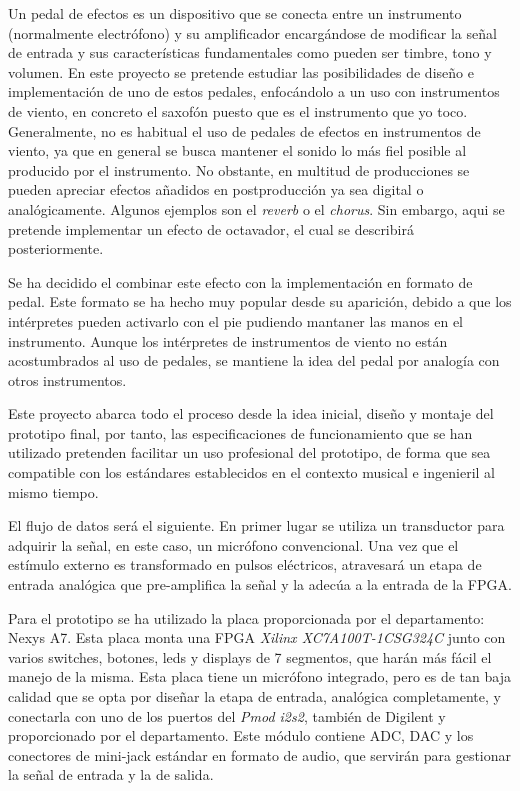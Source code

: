 Un pedal de efectos es un dispositivo que se conecta entre un instrumento (normalmente electrófono) y su amplificador encargándose de modificar la señal de entrada y sus características fundamentales como pueden ser timbre, tono y volumen. En este proyecto se pretende estudiar las posibilidades de diseño e implementación de uno de estos pedales, enfocándolo a un uso con instrumentos de viento, en concreto el saxofón puesto que es el instrumento que yo toco. Generalmente, no es habitual el uso de pedales de efectos en instrumentos de viento, ya que en general se busca mantener el sonido lo más fiel posible al producido por el instrumento. No obstante, en multitud de producciones se pueden apreciar efectos añadidos en postproducción ya sea digital o analógicamente. Algunos ejemplos son el \emph{reverb} o el \emph{chorus}. Sin embargo, aqui se pretende implementar un efecto de octavador, el cual se describirá posteriormente.

Se ha decidido el combinar este efecto con la implementación en formato de pedal. Este formato se ha hecho muy popular desde su aparición, debido a que los intérpretes pueden activarlo con el pie pudiendo mantaner las manos en el instrumento. Aunque los intérpretes de instrumentos de viento no están acostumbrados al uso de pedales, se mantiene la idea del pedal por analogía con otros instrumentos.

Este proyecto abarca todo el proceso desde la idea inicial, diseño y montaje del prototipo final, por tanto, las especificaciones de funcionamiento que se han utilizado pretenden facilitar un uso profesional del prototipo, de forma que sea compatible con los estándares establecidos en el contexto musical e ingenieril al mismo tiempo.

El flujo de datos será el siguiente. En primer lugar se utiliza un transductor para adquirir la señal, en este caso, un micrófono convencional. Una vez que el estímulo externo es transformado en pulsos eléctricos, atravesará un etapa de entrada analógica que pre-amplifica la señal y la adecúa a la entrada de la FPGA.

Para el prototipo se ha utilizado la placa proporcionada por el departamento: Nexys A7. Esta placa monta una FPGA \emph{Xilinx XC7A100T-1CSG324C} junto con varios switches, botones, leds y displays de 7 segmentos, que harán más fácil el manejo de la misma. Esta placa tiene un micrófono integrado, pero es de tan baja calidad que se opta por diseñar la etapa de entrada, analógica completamente, y conectarla con uno de los puertos del \emph{Pmod i2s2}, también de Digilent y proporcionado por el departamento. Este módulo contiene ADC, DAC y los conectores de mini-jack estándar en formato de audio, que servirán para gestionar la señal de entrada y la de salida.

